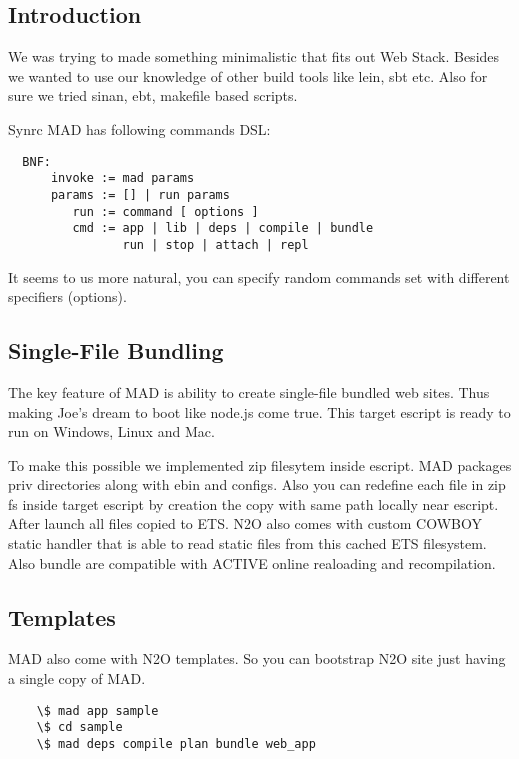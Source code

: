 \subsection{Introduction}

We was trying to made something minimalistic that fits out Web Stack.
Besides we wanted to use our knowledge of other build tools like lein, sbt etc.
Also for sure we tried sinan, ebt, makefile based scripts.

Synrc MAD has following commands DSL:

\vspace{1\baselineskip}
\begin{lstlisting}
  BNF:
      invoke := mad params
      params := [] | run params
         run := command [ options ]
         cmd := app | lib | deps | compile | bundle
                run | stop | attach | repl
\end{lstlisting}
\vspace{1\baselineskip}

It seems to us more natural, you can specify random
commands set with different specifiers (options).

\subsection{Single-File Bundling}

The key feature of MAD is ability to create single-file bundled web sites.
Thus making Joe's dream to boot like node.js come true.
This target escript is ready to run on Windows, Linux and Mac.

To make this possible we implemented zip filesytem inside escript.
MAD packages priv directories along with ebin and configs.
Also you can redefine each file in zip fs inside target
escript by creation the copy with same path locally near escript.
After launch all files copied to ETS.
N2O also comes with custom COWBOY static handler that is able to
read static files from this cached ETS filesystem.
Also bundle are compatible with ACTIVE online realoading and recompilation.

\subsection{Templates}

MAD also come with N2O templates. So you can bootstrap N2O site
just having a single copy of MAD.

\vspace{1\baselineskip}
\begin{lstlisting}
    \$ mad app sample
    \$ cd sample
    \$ mad deps compile plan bundle web_app
\end{lstlisting}
\vspace{1\baselineskip}


